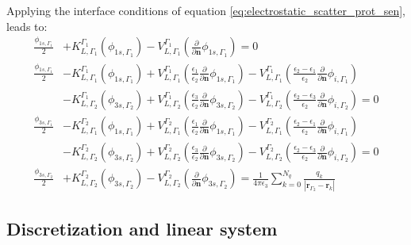 Applying the interface conditions of equation \eqref{eq:electrostatic_scatter_prot_sen},
leads to: 
%
\begin{align} \label{eq:integral_eq_lspr_system}
\frac{\phi_{1s,\Gamma_1}}{2}&+ K_{L,\Gamma_1}^{\Gamma_1}(\phi_{1s,\Gamma_1}) - V_{L,\Gamma_1}^{\Gamma_1} \left(\frac{\partial}{\partial \mathbf{n}}\phi_{1s,\Gamma_1} \right) = 0  \nonumber \\
 \frac{\phi_{1s,\Gamma_1}}{2}& - K_{L,\Gamma_1}^{\Gamma_1}(\phi_{1s,\Gamma_1}) + V_{L,\Gamma_1}^{\Gamma_1} \left(\frac{\epsilon_1}{\epsilon_2}\frac{\partial}{\partial \mathbf{n}}\phi_{1s,\Gamma_1} \right) - V_{L,\Gamma_1}^{\Gamma_1} \left(\frac{\epsilon_2-\epsilon_1}{\epsilon_2}\frac{\partial}{\partial \mathbf{n}}\phi_{i,\Gamma_1} \right) \nonumber\\ 
 & - K_{L,\Gamma_2}^{\Gamma_1}(\phi_{3s,\Gamma_2}) + V_{L,\Gamma_2}^{\Gamma_1} \left(\frac{\epsilon_3}{\epsilon_2}\frac{\partial}{\partial \mathbf{n}}\phi_{3s,\Gamma_2} \right)  - V_{L,\Gamma_2}^{\Gamma_1} \left(\frac{\epsilon_2 -\epsilon_3}{\epsilon_2}\frac{\partial}{\partial \mathbf{n}}\phi_{i,\Gamma_2} \right) = 0   \nonumber \\
 \frac{\phi_{3s,\Gamma_1}}{2}& - K_{L,\Gamma_1}^{\Gamma_2}(\phi_{1s,\Gamma_1}) + V_{L,\Gamma_1}^{\Gamma_2} \left(\frac{\epsilon_1}{\epsilon_2}\frac{\partial}{\partial \mathbf{n}}\phi_{1s,\Gamma_1} \right) - V_{L,\Gamma_1}^{\Gamma_2} \left(\frac{\epsilon_2-\epsilon_1}{\epsilon_2}\frac{\partial}{\partial \mathbf{n}}\phi_{i,\Gamma_1} \right) \nonumber \\
& - K_{L,\Gamma_2}^{\Gamma_2}(\phi_{3s,\Gamma_2}) + V_{L,\Gamma_2}^{\Gamma_2} \left(\frac{\epsilon_3}{\epsilon_2}\frac{\partial}{\partial \mathbf{n}}\phi_{3s,\Gamma_2} \right)  - V_{L,\Gamma_2}^{\Gamma_2} \left(\frac{\epsilon_2 -\epsilon_3}{\epsilon_2}\frac{\partial}{\partial \mathbf{n}}\phi_{i,\Gamma_2} \right) = 0  \nonumber \\
\frac{\phi_{3s,\Gamma_2}}{2}& + K_{L,\Gamma_2}^{\Gamma_2}(\phi_{3s,\Gamma_2}) - V_{L,\Gamma_2}^{\Gamma_2} \left( \frac{\partial}{\partial \mathbf{n}} \phi_{3s,\Gamma_2} \right) = \frac{1}{4\pi\epsilon_3} \sum_{k=0}^{N_q} \frac{q_k}{|\mathbf{r}_{\Gamma_2} - \mathbf{r}_k|} 
\end{align}
%
\subsection{Discretization and linear system}

